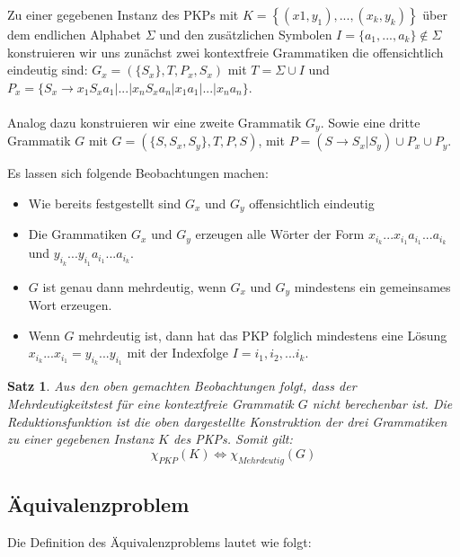 \documentclass[]{scrartcl}
\newtheorem{satz}[definition]{Satz}
\begin{document}
		Zu einer gegebenen Instanz des PKPs mit $K = \left\lbrace (x1, y_1), ..., (x_k, y_k) \right\rbrace$ über dem endlichen Alphabet $\Sigma$ und den zusätzlichen Symbolen $I = \{a_1, ..., a_k\} \notin \Sigma$ konstruieren wir uns zunächst zwei kontextfreie Grammatiken die offensichtlich eindeutig sind:
		\newline\newline
		$G_x = (\{S_x\}, T, P_x, S_x)$ mit $T = \Sigma \cup I$ und $P_x = \{S_x \rightarrow x_1 S_x a_1 | ... | x_n S_x a_n | x_1 a_1 | ... | x_n a_n\}$.\\ \\
		Analog dazu konstruieren wir eine zweite Grammatik $G_y$. Sowie eine dritte Grammatik $G$ mit \newline\newline
		$G = (\{S, S_x, S_y\}, T, P, S)$, mit $P = (S \rightarrow S_x | S_y) \cup P_x \cup P_y$.
		
		Es lassen sich folgende Beobachtungen machen:
		\begin{itemize}
		\item Wie bereits festgestellt sind $G_x$ und $G_y$ offensichtlich eindeutig
		\item Die Grammatiken $G_x$ und $G_y$ erzeugen alle Wörter der Form $x_{i_k}...x_{i_1}a_{i_1}...a_{i_k}$ und $y_{i_k}...y_{i_1}a_{i_1}...a_{i_k}$.
		\item $G$ ist genau dann mehrdeutig, wenn $G_x$ und $G_y$ mindestens ein gemeinsames Wort erzeugen.
		\item Wenn $G$ mehrdeutig ist, dann hat das PKP folglich mindestens eine Lösung $x_{i_k}...x_{i_1} = y_{i_k}...y_{i_1}$ mit der Indexfolge $I = {i_1, i_2, ... i_k}$.
		\end{itemize}
		
		\begin{satz}
		Aus den oben gemachten Beobachtungen folgt, dass der Mehrdeutigkeitstest für eine kontextfreie Grammatik $G$ nicht berechenbar ist. Die Reduktionsfunktion ist die oben dargestellte Konstruktion der drei Grammatiken zu einer gegebenen Instanz $K$ des PKPs. Somit gilt:
		\[\chi_{PKP} (K) \Leftrightarrow \chi_{Mehrdeutig}(G)\]
		\end{satz}
		

	\subsection{Äquivalenzproblem}
	
		Die Definition des Äquivalenzproblems lautet wie folgt:
		
\end{document}
